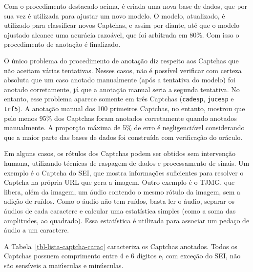 \documentclass[12pt,twoside,brazilian]{book}
\begin{document}
Com o procedimento destacado acima, é criada uma nova base de dados, que
por sua vez é utilizada para ajustar um novo modelo. O modelo,
atualizado, é utilizado para classificar novos Captchas, e assim por
diante, até que o modelo ajustado alcance uma acurácia razoável, que foi
arbitrada em 80\%. Com isso o procedimento de anotação é finalizado.

O único problema do procedimento de anotação diz respeito aos Captchas
que não aceitam várias tentativas. Nesses casos, não é possível
verificar com certeza absoluta que um caso anotado manualmente (após a
tentativa do modelo) foi anotado corretamente, já que a anotação manual
seria a segunda tentativa. No entanto, esse problema aparece somente em
três Captchas (\texttt{cadesp}, \texttt{jucesp} e \texttt{trf5}). A
anotação manual dos 100 primeiros Captchas, no entanto, mostrou que pelo
menos 95\% dos Captchas foram anotados corretamente quando anotados
manualmente. A proporção máxima de 5\% de erro é negligenciável
considerando que a maior parte das bases de dados foi construída com
verificação do oráculo.

Em alguns casos, os rótulos dos Captchas podem ser obtidos sem
intervenção humana, utilizando técnicas de raspagem de dados e
processamento de sinais. Um exemplo é o Captcha do SEI, que mostra
informações suficientes para resolver o Captcha na própria URL que gera
a imagem. Outro exemplo é o TJMG, que libera, além da imagem, um áudio
contendo o mesmo rótulo da imagem, sem a adição de ruídos. Como o áudio
não tem ruídos, basta ler o áudio, separar os áudios de cada caractere e
calcular uma estatística simples (como a soma das amplitudes, ao
quadrado). Essa estatística é utilizada para associar um pedaço de áudio
a um caractere.

A Tabela~\ref{tbl-lista-captcha-carac} caracteriza os Captchas anotados.
Todos os Captchas possuem comprimento entre 4 e 6 dígitos e, com exceção
do SEI, não são sensíveis a maiúsculas e minúsculas.
\end{document}
